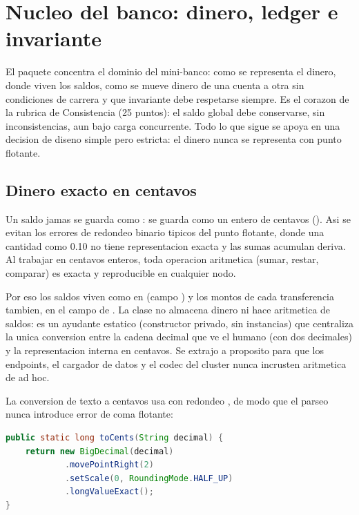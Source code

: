 \section{Nucleo del banco: dinero, ledger e invariante}

El paquete  concentra el dominio del mini-banco: como se representa
el dinero, donde viven los saldos, como se mueve dinero de una cuenta a otra sin
condiciones de carrera y que invariante debe respetarse siempre. Es el corazon
de la rubrica de Consistencia (25 puntos): el saldo global debe conservarse, sin
inconsistencias, aun bajo carga concurrente. Todo lo que sigue se apoya en una
decision de diseno simple pero estricta: el dinero nunca se representa con punto
flotante.

\subsection{Dinero exacto en centavos}

Un saldo jamas se guarda como : se guarda como un entero de
centavos (). Asi se evitan los errores de redondeo binario tipicos
del punto flotante, donde una cantidad como 0.10 no tiene representacion exacta y
las sumas acumulan deriva. Al trabajar en centavos enteros, toda operacion
aritmetica (sumar, restar, comparar) es exacta y reproducible en cualquier nodo.

Por eso los saldos viven como  en 
(campo ) y los montos de cada transferencia tambien, en el
campo  de . La clase
 no almacena dinero ni hace aritmetica de saldos: es un
ayudante estatico (constructor privado, sin instancias) que centraliza la unica
conversion entre la cadena decimal que ve el humano (con dos decimales) y la
representacion interna en centavos. Se extrajo a proposito para que los
endpoints, el cargador de datos y el codec del cluster nunca incrusten
aritmetica de  ad hoc.

La conversion de texto a centavos usa  con redondeo
, de modo que el parseo nunca introduce error de coma flotante:

\begin{lstlisting}[language=Java,caption={Conversion exacta de decimal a centavos en Money.toCents}]
public static long toCents(String decimal) {
    return new BigDecimal(decimal)
            .movePointRight(2)
            .setScale(0, RoundingMode.HALF_UP)
            .longValueExact();
}
\end{lstlisting}

